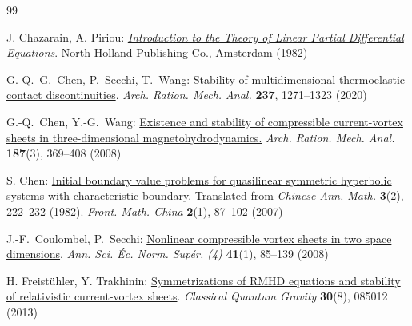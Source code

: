 \documentclass[twoside,11pt]{article}
\numberwithin{equation}{section}
\begin{document}
{\begin{thebibliography}{99}
			
			
			  J. Chazarain, A. Piriou: \href{https://www.sciencedirect.com/bookseries/studies-in-mathematics-and-its-applications/vol/14/suppl/C}{\it Introduction to the Theory of Linear Partial Differential Equations}. North-Holland Publishing Co., Amsterdam (1982)

			 G.-Q.~G.~Chen, P.~Secchi, T.~Wang: \href{https://doi.org/10.1007/s00205-020-01531-5}{Stability of multidimensional thermoelastic contact discontinuities}. {\it Arch. Ration. Mech. Anal.} {\bf 237}, 1271--1323 (2020)			
			
  G.-Q.~Chen,  Y.-G.~Wang:
\href{https://doi.org/10.1007/s00205-007-0070-8}{Existence and stability of compressible current-vortex sheets in three-dimensional magnetohydrodynamics.} {\it Arch. Ration. Mech. Anal.} {\bf 187}(3), 369--408 (2008)

			
		
			

			
			 S. Chen: \href{https://doi.org/10.1007/s11464-007-0006-5}{Initial boundary value problems for quasilinear symmetric hyperbolic systems with characteristic boundary}. Translated from {\it Chinese Ann. Math.} {\bf 3}(2), 222--232 (1982). {\it Front. Math. China} {\bf 2}(1), 87--102 (2007)
			
			 J.-F.~Coulombel,  P.~Secchi: \href{https://doi.org/10.24033/asens.2064}{Nonlinear compressible vortex sheets in two space dimensions}. {\it Ann. Sci. \'{E}c. Norm. Sup\'{e}r. (4)} {\bf 41}(1), 85--139 (2008)
			
			
			
			 H. Freist\"{u}hler, Y. Trakhinin: \href{https://doi.org/10.1088/0264-9381/30/8/085012}{Symmetrizations of RMHD equations and stability of relativistic current-vortex sheets}. {\it Classical Quantum Gravity} {\bf 30}(8), 085012 (2013)


\end{thebibliography}}
\end{document}
